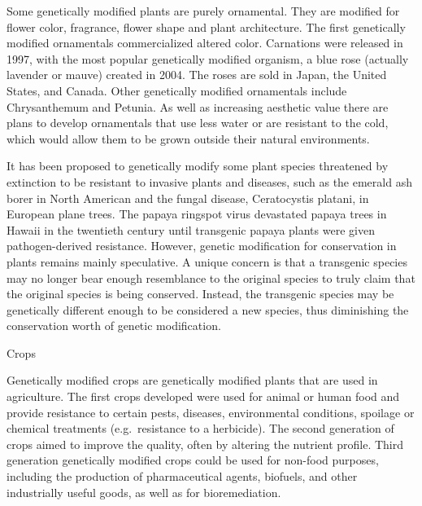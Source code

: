 Some genetically modified plants are purely ornamental. They are modified for flower color, fragrance, flower shape and plant architecture. The first genetically modified ornamentals commercialized altered color. Carnations were released in 1997, with the most popular genetically modified organism, a blue rose (actually lavender or mauve) created in 2004. The roses are sold in Japan, the United States, and Canada. Other genetically modified ornamentals include Chrysanthemum and Petunia. As well as increasing aesthetic value there are plans to develop ornamentals that use less water or are resistant to the cold, which would allow them to be grown outside their natural environments.

It has been proposed to genetically modify some plant species threatened by extinction to be resistant to invasive plants and diseases, such as the emerald ash borer in North American and the fungal disease, Ceratocystis platani, in European plane trees. The papaya ringspot virus devastated papaya trees in Hawaii in the twentieth century until transgenic papaya plants were given pathogen-derived resistance. However, genetic modification for conservation in plants remains mainly speculative. A unique concern is that a transgenic species may no longer bear enough resemblance to the original species to truly claim that the original species is being conserved. Instead, the transgenic species may be genetically different enough to be considered a new species, thus diminishing the conservation worth of genetic modification.

Crops

Genetically modified crops are genetically modified plants that are used in agriculture. The first crops developed were used for animal or human food and provide resistance to certain pests, diseases, environmental conditions, spoilage or chemical treatments (e.g.~resistance to a herbicide). The second generation of crops aimed to improve the quality, often by altering the nutrient profile. Third generation genetically modified crops could be used for non-food purposes, including the production of pharmaceutical agents, biofuels, and other industrially useful goods, as well as for bioremediation.

